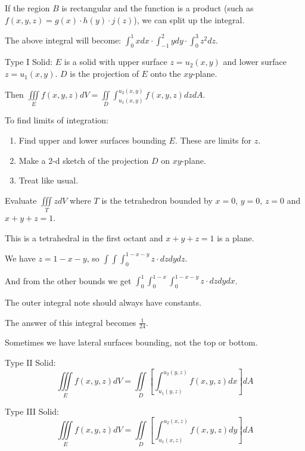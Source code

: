 \documentclass[../calc3.tex]{subfiles}
\begin{document}
If the region $B$ is rectangular and the function is a product (such as $f(x,y,z)=g(x)\cdot h(y)\cdot j(z)$), we can split up the integral.

The above integral will become: $\int_0^1 xdx \cdot \int_{-1}^2 y dy \cdot \int_0^3 z^2 dz$.

Type I Solid: $E$ is a solid with upper surface $z=u_2(x,y)$ and lower surface $z=u_1(x,y)$. $D$ is the projection of $E$ onto the $xy$-plane.

Then $\iiint\limits_{E} f(x,y,z)dV = \iint\limits_{D} \int_{u_1(x,y)}^{u_2(x,y)}f(x,y,z)dz dA$.

To find limits of integration:
\begin{enumerate}
    \item Find upper and lower surfaces bounding $E$. These are limits for $z$.
    \item Make a $2$-d sketch of the projection $D$ on $xy$-plane.
    \item Treat like usual.
\end{enumerate}

\begin{example}
    Evaluate $\iiint\limits_{T} zdV$ where $T$ is the tetrahedron bounded by $x=0$, $y=0$, $z=0$ and $x+y+z=1$.

    This is a tetrahedral in the first octant and $x+y+z=1$ is a plane.

    We have $z=1-x-y$, so $\int \int \int_0^{1-x-y}z\cdot dz dy dz$.

    And from the other bounds we get $\int_0^1 \int_0^{1-x} \int_0^{1-x-y}z\cdot dz dy dx$.

    The outer integral note should always have constants.

    The answer of this integral becomes $\frac{1}{24}$.
\end{example}

Sometimes we have lateral surfaces bounding, not the top or bottom.

Type II Solid:
\[ \iiint\limits_{E} f(x,y,z)dV = \iint\limits_{D} \left[ \int_{u_1(y,z)}^{u_2(y,z)}f(x,y,z)dx\right]dA \]

Type III Solid:
\[ \iiint\limits_{E} f(x,y,z)dV = \iint\limits_{D} \left[ \int_{u_1(x,z)}^{u_2(x,z)}f(x,y,z)dy\right] dA \]
\end{document}
